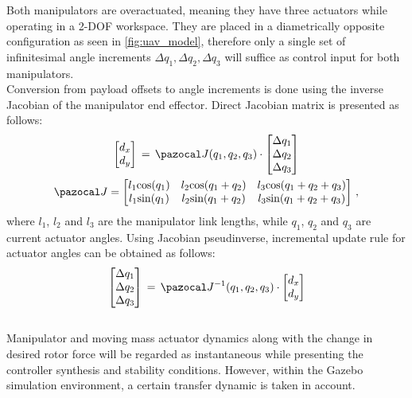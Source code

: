 Both manipulators are overactuated, meaning they have three actuators while operating in a 2-DOF workspace. They are placed in a diametrically opposite configuration as seen in \ref{fig:uav_model}, therefore only a single set of infinitesimal angle increments $\Delta q_1, \Delta q_2, \Delta q_3$ will suffice as control input for both manipulators. \\
Conversion from payload offsets to angle increments is done using the inverse Jacobian of the manipulator end effector. Direct Jacobian matrix is presented as follows:
\begin{gather}
	\begin{bmatrix}
		d_x \\
		d_y
	\end{bmatrix}
	\, = \, 
	\Ja (q_1, q_2, q_3)
	\cdot 
	\begin{bmatrix}
		\Delta q_1 \\
		\Delta q_2 \\
		\Delta q_3
	\end{bmatrix} \\
	\Ja = 
	\begin{bmatrix}
		l_1\text{cos}(q_1) & l_2 \text{cos}(q_1 + q_2) & l_3 \text{cos}(q_1 + q_2 + q_3) \\
		l_1\text{sin}(q_1) & l_2 \text{sin}(q_1 + q_2) & l_3 \text{sin}(q_1 + q_2 + q_3) 
	\end{bmatrix} \, ,
\end{gather}
where $l_1$, $l_2$ and $l_3$ are the manipulator link lengths, while $q_1$, $q_2$ and $q_3$ are current actuator angles. Using Jacobian pseudinverse, incremental update rule for actuator angles can be obtained as follows:
\begin{equation}
	\begin{bmatrix}
	\Delta q_1 \\
	\Delta q_2 \\
	\Delta q_3
	\end{bmatrix} 
	\, = \, \Ja^{-1} (q_1, q_2, q_3) \cdot
	\begin{bmatrix}
	d_x \\
	d_y
	\end{bmatrix}
\end{equation}
\\
Manipulator and moving mass actuator dynamics along with the change in desired rotor force will be regarded as instantaneous while presenting the controller synthesis and stability conditions. However, within the Gazebo simulation environment, a certain transfer dynamic is taken in account.